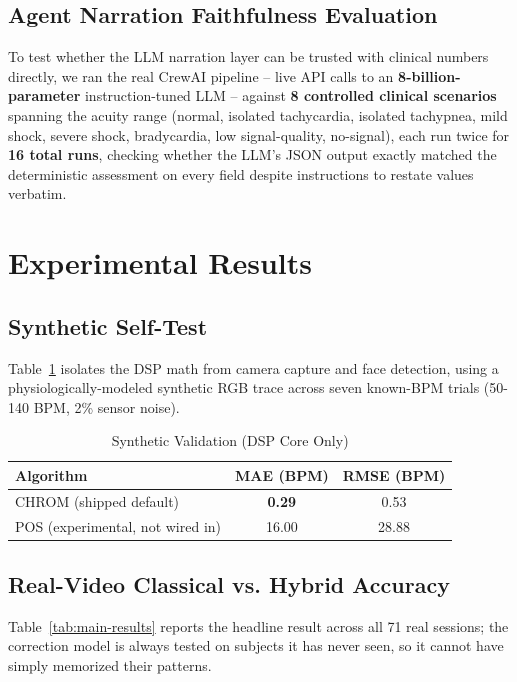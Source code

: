 \documentclass[conference]{IEEEtran}
\begin{document}
\subsection{\textbf{Agent Narration Faithfulness Evaluation}}
\label{sec:faithfulness}
To test whether the LLM narration layer can be trusted with clinical numbers directly, we ran the real CrewAI pipeline -- live API calls to an \textbf{8-billion-parameter} instruction-tuned LLM -- against \textbf{8 controlled clinical scenarios} spanning the acuity range (normal, isolated tachycardia, isolated tachypnea, mild shock, severe shock, bradycardia, low signal-quality, no-signal), each run twice for \textbf{16 total runs}, checking whether the LLM's JSON output exactly matched the deterministic assessment on every field despite instructions to restate values verbatim.

\section{\textbf{Experimental Results}}
\label{sec:results}

\subsection{\textbf{Synthetic Self-Test}}
Table~\ref{tab:synthetic} isolates the DSP math from camera capture and face detection, using a physiologically-modeled synthetic RGB trace across seven known-BPM trials (50-140 BPM, 2\% sensor noise).

\begin{table}[h]
\centering
\caption{Synthetic Validation (DSP Core Only)}
\label{tab:synthetic}
\begin{tabular}{@{}lcc@{}}
\toprule
\textbf{Algorithm} & \textbf{MAE (BPM)} & \textbf{RMSE (BPM)} \\
\midrule
CHROM (shipped default) & \textbf{0.29} & 0.53 \\
POS (experimental, not wired in) & 16.00 & 28.88 \\
\bottomrule
\end{tabular}
\end{table}

\subsection{\textbf{Real-Video Classical vs. Hybrid Accuracy}}
Table~\ref{tab:main-results} reports the headline result across all 71 real sessions; the correction model is always tested on subjects it has never seen, so it cannot have simply memorized their patterns.
\end{document}
